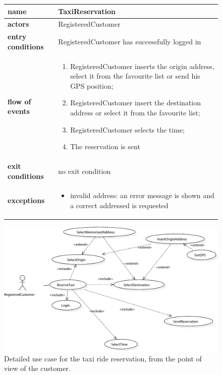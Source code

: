 \begin{figure}\begin{tabularx}{\textwidth}{ >{\bfseries}l X }\toprule%
	name				&	TaxiReservation%
	\\ \midrule%
	actors				&	RegisteredCustomer%
	\\ \midrule%
	entry conditions	&	RegisteredCustomer has successfully logged in%
	\\ \midrule%
	flow of events		&	\begin{enumerate}%
		\item RegisteredCustomer inserts the origin address, select it from the favourite list or send his GPS position;%
		\item RegisteredCustomer insert the destination address or select it from the favourite list;%
		\item RegisteredCustomer selects the time;%
		\item The reservation is sent%
	\end{enumerate} \\ \midrule%
	exit conditions		&	no exit condition%
	\\ \midrule%
	exceptions			&	\begin{itemize}%
		\item invalid address: an error message is shown and a correct addressed is requested%
	\end{itemize} \\ \bottomrule%
\end{tabularx}\end{figure}



\begin{figure}%
	\includegraphics[width=\textwidth]{img/U_TaxiReservation}%
	\caption{Detailed use case for the taxi ride reservation, from the point of view of the customer.}\label{fig:taxiReservation}%
\end{figure}



